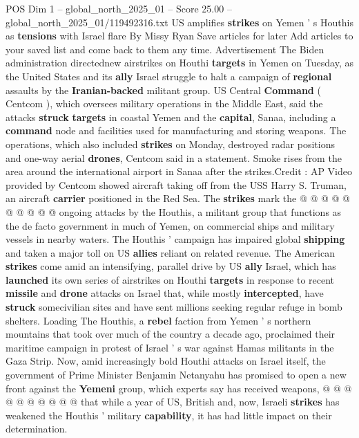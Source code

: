 \begin{textsample}{POS Dim 1 – global\_north\_2025\_01 – Score 25.00 – global\_north\_2025\_01/119492316.txt}  \label{ex:f1_pos_392}
US amplifies \textbf{strikes} on Yemen ' s Houthis as \textbf{tensions} with Israel flare By Missy Ryan Save articles for later Add articles to your saved list and come back to them any time.
Advertisement The Biden administration directednew airstrikes on Houthi \textbf{targets} in Yemen on Tuesday, as the United States and its \textbf{ally} Israel struggle to halt a campaign of \textbf{regional} assaults by the \textbf{Iranian-backed} militant group.
US Central \textbf{Command} ( Centcom ), which oversees military operations in the Middle East, said the attacks \textbf{struck} \textbf{targets} in coastal Yemen and the \textbf{capital}, Sanaa, including a \textbf{command} node and facilities used for manufacturing and storing weapons.
The operations, which also included \textbf{strikes} on Monday, destroyed radar positions and one-way aerial \textbf{drones}, Centcom said in a statement.
Smoke rises from the area around the international airport in Sanaa after the strikes.Credit : AP Video provided by Centcom showed aircraft taking off from the USS Harry S.
Truman, an aircraft \textbf{carrier} positioned in the Red Sea.
The \textbf{strikes} mark the @ @ @ @ @ @ @ @ @ @ ongoing attacks by the Houthis, a militant group that functions as the de facto government in much of Yemen, on commercial ships and military vessels in nearby waters.
The Houthis ' campaign has impaired global \textbf{shipping} and taken a major toll on US \textbf{allies} reliant on related revenue.
The American \textbf{strikes} come amid an intensifying, parallel drive by US \textbf{ally} Israel, which has \textbf{launched} its own series of airstrikes on Houthi \textbf{targets} in response to recent \textbf{missile} and \textbf{drone} attacks on Israel that, while mostly \textbf{intercepted}, have \textbf{struck} somecivilian sites and have sent millions seeking regular refuge in bomb shelters.
Loading The Houthis, a \textbf{rebel} faction from Yemen ' s northern mountains that took over much of the country a decade ago, proclaimed their maritime campaign in protest of Israel ' s war against Hamas militants in the Gaza Strip.
Now, amid increasingly bold Houthi attacks on Israel itself, the government of Prime Minister Benjamin Netanyahu has promised to open a new front against the \textbf{Yemeni} group, which experts say has received weapons, @ @ @ @ @ @ @ @ @ @ that while a year of US, British and, now, Israeli \textbf{strikes} has weakened the Houthis ' military \textbf{capability}, it has had little impact on their determination.

\end{textsample}
